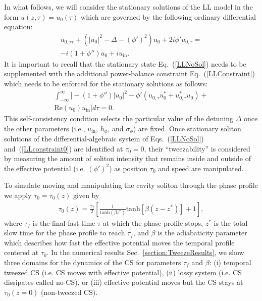 \documentclass[aps,floatfix,showpacs,preprintnumbers,twocolumn,nofootinbib]{revtex4}
\begin{document}
In what follows, we will consider the stationary solutions of the LL model in the form $u(z, \tau) = u_0(\tau)$ which are governed by the following ordinary differential equation:
\begin{align}
 u_{0,\tau\tau}  + \left( |u_0|^2 -\Delta -  (\phi')^2 \right) u_0 + 2 i \phi' u_{0, \tau} = \nonumber \\
   - i (1+\phi'')  u_0 + i u_{\mathrm{in}}.
\label{LLNoSol}
\end{align}
It is important to recall that the stationary state Eq.~(\ref{LLNoSol}) needs to be supplemented with the additional power-balance constraint Eq.~(\ref{LLConstraint}) which needs to be enforced for the stationary solutions as follows:
\begin{align}
\int_{-\infty}^{\infty} \Big[ - (1 + \phi'') |u_0|^2 - \phi' \left( u_{0,\tau} u_0^* + u_{0,\tau}^*u_0 \right) +\nonumber \\
 \mathrm{Re}(u_0) u_{\mathrm{in}} \Big] d \tau = 0.
\label{LLconstraint0}
\end{align}
This self-consistency condition selects the particular value of the detuning $\Delta$ once the other parameters (i.e., $u_{\mathrm{in}}$, $h_{\phi}$, and $\sigma_{\phi}$) are fixed.  Once stationary soliton solutions of the differential-algebraic system of Eqs.~(\ref{LLNoSol}) and~(\ref{LLconstraint0}) are identified at $\tau_0 = 0$, their ``tweezability'' is considered by measuring the amount of soliton intensity that remains inside and outside of the effective potential (i.e. $(\phi')^2$) as position $\tau_0$ and speed are manipulated.

To simulate moving and manipulating the cavity soliton through the phase profile we apply $\tau_0 = \tau_0(z)$ given by 
\begin{align}
\tau_0 (z) = \frac{\tau_f}{2} \left [ \frac{1}{\mathrm{tanh} (\beta z^*)} \mathrm{tanh} [\beta (z - z^*)] + 1\right],
\label{tau0}
\end{align} 
where $\tau_f$ is the final fast time $\tau$ at which the phase profile stops, $z^*$ is the total slow time for the phase profile to reach $\tau_f$, and $\beta$ is the adiabaticity parameter which describes how fast the effective potential moves the temporal profile centered at $\tau_0$.  In the numerical results Sec.~\ref{section:TweezeResults}, we show three domains for the dynamics of the CS for parameters $\tau_f$ and $\beta$: (i) temporal tweezed CS (i.e. CS moves with effective potential), (ii) lossy system (i.e. CS dissipates called no-CS), or (iii) effective potential moves but the CS stays at $\tau_0(z=0)$ (non-tweezed CS). 
\end{document}
